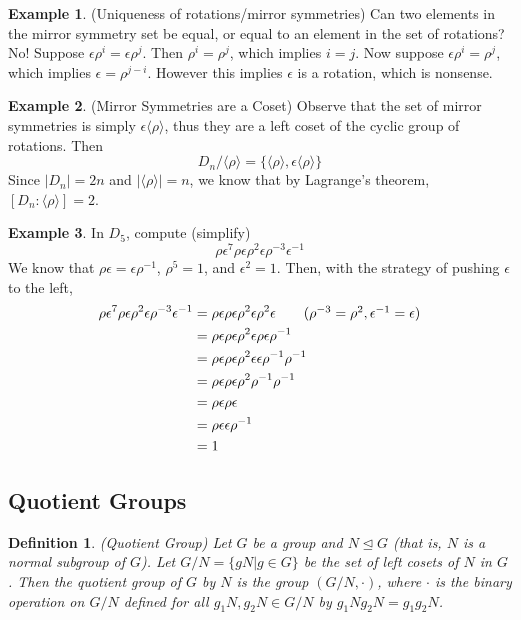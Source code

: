 \documentclass[12pt]{article}
\newtheorem{definition}{Definition}
\theoremstyle{definition}
\newtheorem{example}{Example}
\theoremstyle{definition}
\newcommand{\e}{\epsilon}
\begin{document}
\begin{example}(Uniqueness of rotations/mirror symmetries)
Can two elements in the mirror symmetry set be equal, or equal to an element in the set of rotations? No! Suppose $\e \rho^i = \e \rho^j$. Then $\rho^i = \rho^j$, which implies $i = j$. Now suppose $\e \rho^i = \rho^j$, which implies $\e = \rho^{j-i}$. However this implies $\e$ is a rotation, which is nonsense.
\end{example}

\begin{example}(Mirror Symmetries are a Coset)
Observe that the set of mirror symmetries is simply $\e \langle \rho \rangle$, thus they are a left coset of the cyclic group of rotations.  Then
\begin{equation}
	D_n / \langle \rho \rangle = \{ \langle \rho \rangle, \e \langle \rho \rangle\}
\end{equation}
Since $|D_n| = 2n$ and $|\langle \rho \rangle| = n$, we know that by Lagrange's theorem, $[D_n : \langle \rho \rangle] = 2$. 
\end{example}

\begin{example}
In $D_5$, compute (simplify)
\begin{equation}
\rho \e^7 \rho \e \rho^2 \e \rho^{-3} \e^{-1}
\end{equation}
We know that $\rho \e = \e \rho^{-1}$, $\rho^5 = 1$, and $\e^2 = 1$. Then, with the strategy of pushing $\e$ to the left,
\begin{align*}
	\rho \e^7 \rho \e \rho^2 \e \rho^{-3} \e^{-1} &= \rho \e \rho \e \rho^2 \e \rho^{2} \e \tag{$\rho^{-3} = \rho^{2}, \e^{-1} = \e$} \\
	&= \rho \e \rho \e \rho^2 \e \rho \e \rho^{-1} \\
	&= \rho \e \rho \e \rho^2 \e \e \rho^{-1} \rho^{-1} \\
	&= \rho \e \rho \e \rho^2 \rho^{-1} \rho^{-1} \\
	&= \rho \e \rho \e \\
	&= \rho \e \e \rho^{-1} \\
	&= 1
\end{align*}
\end{example}

\subsection{Quotient Groups}

\begin{definition}(Quotient Group)
Let $G$ be a group and $N \trianglelefteq G$ (that is, $N$ is a normal subgroup of $G$). Let $G/N = \{gN|g \in G\}$ be the set of left cosets of $N$ in $G$. Then the quotient group of $G$ by $N$ is the group $(G/N, \cdot)$, where $\cdot$ is the binary operation on $G/N$ defined for all $g_1 N, g_2 N \in G / N$ by $g_1 N g_2 N = g_1g_2N$. 
\end{definition}
\end{document}
